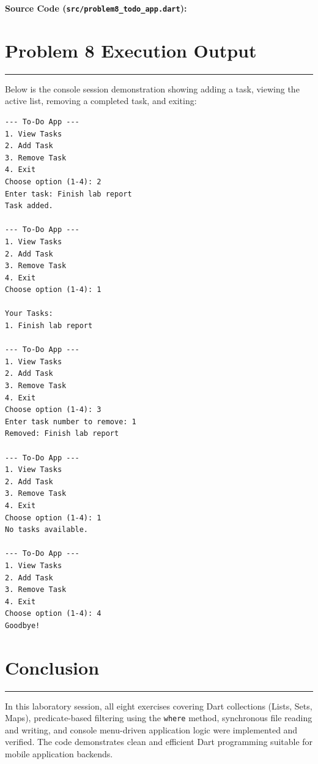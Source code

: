 \documentclass[11pt,a4paper]{article}
\begin{document}
\vspace{0.1cm}
\textbf{Source Code (\texttt{src/problem8\_todo\_app.dart}):}


\newpage

\section*{Problem 8 Execution Output}
\noindent\rule{\textwidth}{0.4pt}\vspace{0.1cm}

Below is the console session demonstration showing adding a task, viewing the active list, removing a completed task, and exiting:

\begin{lstlisting}[style=outputstyle]
--- To-Do App ---
1. View Tasks
2. Add Task
3. Remove Task
4. Exit
Choose option (1-4): 2
Enter task: Finish lab report
Task added.

--- To-Do App ---
1. View Tasks
2. Add Task
3. Remove Task
4. Exit
Choose option (1-4): 1

Your Tasks:
1. Finish lab report

--- To-Do App ---
1. View Tasks
2. Add Task
3. Remove Task
4. Exit
Choose option (1-4): 3
Enter task number to remove: 1
Removed: Finish lab report

--- To-Do App ---
1. View Tasks
2. Add Task
3. Remove Task
4. Exit
Choose option (1-4): 1
No tasks available.

--- To-Do App ---
1. View Tasks
2. Add Task
3. Remove Task
4. Exit
Choose option (1-4): 4
Goodbye!
\end{lstlisting}

\vspace{0.5cm}
\section*{Conclusion}
\noindent\rule{\textwidth}{0.5pt}\vspace{0.15cm}
In this laboratory session, all eight exercises covering Dart collections (Lists, Sets, Maps), predicate-based filtering using the \texttt{where} method, synchronous file reading and writing, and console menu-driven application logic were implemented and verified. The code demonstrates clean and efficient Dart programming suitable for mobile application backends.
\end{document}
